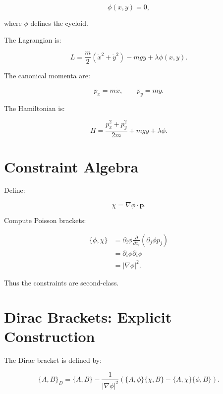 \documentclass[11pt]{article}
\begin{document}
\begin{equation}
\phi(x,y) = 0,
\end{equation}

where $\phi$ defines the cycloid.

The Lagrangian is:

\begin{equation}
L = \frac{m}{2}(\dot{x}^2 + \dot{y}^2) - mgy + \lambda \phi(x,y).
\end{equation}

The canonical momenta are:

\begin{equation}
p_x = m\dot{x}, \qquad p_y = m\dot{y}.
\end{equation}

The Hamiltonian is:

\begin{equation}
H = \frac{p_x^2 + p_y^2}{2m} + mgy + \lambda \phi.
\end{equation}

\section{Constraint Algebra}

Define:

\begin{equation}
\chi = \nabla \phi \cdot \mathbf{p}.
\end{equation}

Compute Poisson brackets:

\begin{align}
\{\phi, \chi\}
&= \partial_i \phi \frac{\partial}{\partial x_i}(\partial_j \phi p_j) \\
&= \partial_i \phi \partial_i \phi \\
&= |\nabla \phi|^2.
\end{align}

Thus the constraints are second-class.

\section{Dirac Brackets: Explicit Construction}

The Dirac bracket is defined by:

\begin{equation}
\{A,B\}_D =
\{A,B\}
- \frac{1}{|\nabla\phi|^2}
\left(
\{A,\phi\}\{\chi,B\}
-
\{A,\chi\}\{\phi,B\}
\right).
\end{equation}
\end{document}
